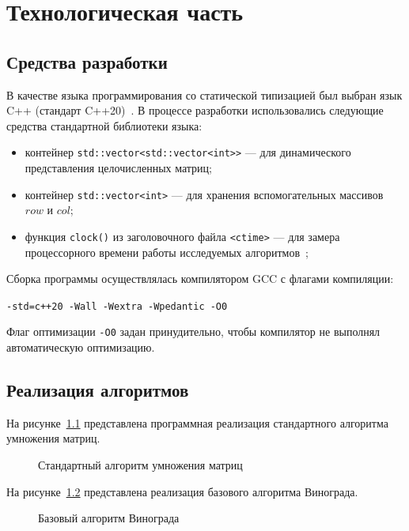 \chapter{Технологическая часть}

\section{Средства разработки}

В качестве языка программирования со статической типизацией был выбран язык C++ (стандарт C++20)~\cite{iso_cpp}. В процессе разработки использовались следующие средства стандартной библиотеки языка:
\begin{itemize}
    \item контейнер \texttt{std::vector<std::vector<int>>} --- для динамического представления целочисленных матриц;
    \item контейнер \texttt{std::vector<int>} --- для хранения вспомогательных массивов $row$ и $col$;
    \item функция \texttt{clock()} из заголовочного файла \texttt{<ctime>} --- для замера процессорного времени работы исследуемых алгоритмов~\cite{cpp_clock};
\end{itemize}

Сборка программы осуществлялась компилятором GCC с флагами компиляции:
\begin{center}
\texttt{-std=c++20 -Wall -Wextra -Wpedantic -O0}
\end{center}
Флаг оптимизации \texttt{-O0} задан принудительно, чтобы компилятор не выполнял автоматическую оптимизацию.

\section{Реализация алгоритмов}

На рисунке~\ref{fig:std_mult} представлена программная реализация стандартного алгоритма умножения матриц.
\begin{figure}[H]
    \centering
    
    \caption{Стандартный алгоритм умножения матриц}
    \label{fig:std_mult}
\end{figure}

На рисунке~\ref{fig:winograd_mult} представлена реализация базового алгоритма Винограда.
\begin{figure}[H]
    \centering
    
    \caption{Базовый алгоритм Винограда}
    \label{fig:winograd_mult}
\end{figure}

